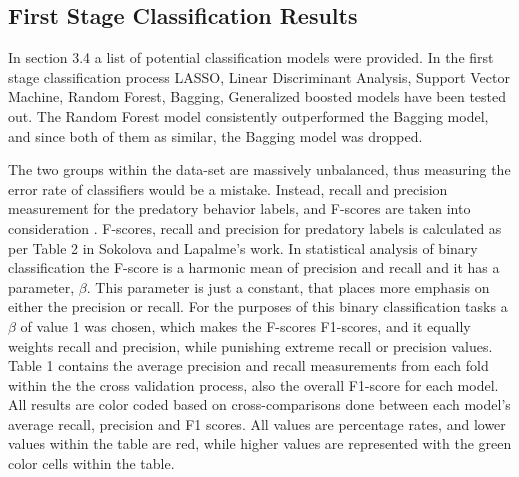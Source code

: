 \documentclass[11pt]{article}
\begin{document}
\subsection{First Stage Classification Results}
In section 3.4 a list of potential classification models were provided. In the first stage classification process LASSO, Linear Discriminant Analysis, Support Vector Machine, Random Forest, Bagging, Generalized boosted models have been tested out. The Random Forest model consistently outperformed the Bagging model, and since both of them as similar, the Bagging model was dropped.

The two groups within the data-set are massively unbalanced, thus measuring the error rate of classifiers would be a mistake. Instead, recall and precision measurement for the predatory behavior labels, and F-scores are taken into consideration \cite{sokolova2009systematic}. F-scores, recall and precision for predatory labels is calculated as per Table 2 in Sokolova and Lapalme's work. In statistical analysis of binary classification the F-score is a harmonic mean of precision and recall and it has a parameter, $\beta$. This parameter is just a constant, that places more emphasis on either the precision or recall. For the purposes of this binary classification tasks a $\beta$ of value 1 was chosen, which makes the F-scores F1-scores, and it equally weights recall and precision, while punishing extreme recall or precision values. Table 1 contains the average precision and recall measurements from each fold within the the cross validation process, also the overall F1-score for each model. All results are color coded based on cross-comparisons done between each model's average recall, precision and F1 scores. All values are percentage rates, and lower values within the table are red, while higher values are represented with the green color cells within the table.
\end{document}
